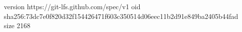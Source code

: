 version https://git-lfs.github.com/spec/v1
oid sha256:73dc7e0f820d32f154426471f603c350514d06eec11b2d91e849ba2405b44fad
size 2168
